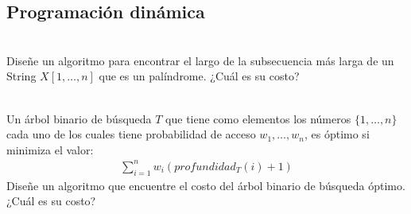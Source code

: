 \documentclass[dcc,uchile]{fcfmcourse}
\begin{document}
\begin{problems}
\section*{Programación dinámica}
\\
Diseñe un algoritmo para encontrar el largo de la subsecuencia más larga de un String $X[1,\ldots,n]$ que es un palíndrome. ¿Cuál es su costo?

\\
Un árbol binario de búsqueda $T$ que tiene como elementos los números $\{1,\ldots,n\}$ cada uno de los cuales tiene probabilidad de acceso $w_{1},\ldots,w_{n}$, es óptimo si minimiza el valor:
\begin{align*}
    \sum_{i=1}^{n}w_{i}(profundidad_{T}(i) + 1)
\end{align*}
Diseñe un algoritmo que encuentre el costo del árbol binario de búsqueda óptimo. ¿Cuál es su costo?
\end{problems}
\end{document}
